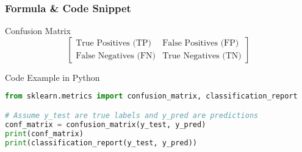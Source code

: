 \documentclass[aspectratio=169]{beamer}
\begin{document}
\begin{frame}[fragile]
    \frametitle{Formula \& Code Snippet}
    \begin{block}{Confusion Matrix}
    \begin{equation}
    \begin{bmatrix}
    \text{True Positives (TP)} & \text{False Positives (FP)} \\
    \text{False Negatives (FN)} & \text{True Negatives (TN)}
    \end{bmatrix}
    \end{equation}
    \end{block}
    
    \begin{block}{Code Example in Python}
    \begin{lstlisting}[language=Python]
from sklearn.metrics import confusion_matrix, classification_report

# Assume y_test are true labels and y_pred are predictions
conf_matrix = confusion_matrix(y_test, y_pred)
print(conf_matrix)
print(classification_report(y_test, y_pred))
    \end{lstlisting}
    \end{block}
\end{frame}
\end{document}
